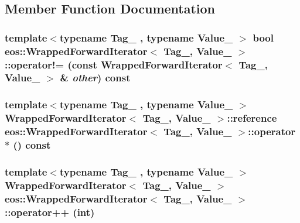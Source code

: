 \subsection{Member Function Documentation}
\hypertarget{classeos_1_1WrappedForwardIterator_a5fb87c43d4ca1c5a0ceffd97b4a4fc78}{
\subsubsection[{operator!=}]{\setlength{\rightskip}{0pt plus 5cm}template$<$typename Tag\_\- , typename Value\_\- $>$ bool {\bf eos::WrappedForwardIterator}$<$ Tag\_\-, Value\_\- $>$::operator!= (const {\bf WrappedForwardIterator}$<$ Tag\_\-, Value\_\- $>$ \& {\em other}) const}}
\label{classeos_1_1WrappedForwardIterator_a5fb87c43d4ca1c5a0ceffd97b4a4fc78}
\hypertarget{classeos_1_1WrappedForwardIterator_ae02a50270f0a0fc3ccae98a41c2d144c}{
\subsubsection[{operator$\ast$}]{\setlength{\rightskip}{0pt plus 5cm}template$<$typename Tag\_\- , typename Value\_\- $>$ {\bf WrappedForwardIterator}$<$ Tag\_\-, Value\_\- $>$::{\bf reference} {\bf eos::WrappedForwardIterator}$<$ Tag\_\-, Value\_\- $>$::operator$\ast$ () const}}
\label{classeos_1_1WrappedForwardIterator_ae02a50270f0a0fc3ccae98a41c2d144c}
\hypertarget{classeos_1_1WrappedForwardIterator_a34a30fd266a0f1c8610dd0b354c4dd21}{
\subsubsection[{operator++}]{\setlength{\rightskip}{0pt plus 5cm}template$<$typename Tag\_\- , typename Value\_\- $>$ {\bf WrappedForwardIterator}$<$ Tag\_\-, Value\_\- $>$ {\bf eos::WrappedForwardIterator}$<$ Tag\_\-, Value\_\- $>$::operator++ (int)}}
